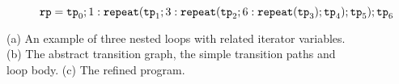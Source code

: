 \begin{figure}
\begin{subfigure}{.9\textwidth}
\begin{centering}
    $\mathtt{rp} = \mathtt{tp}_0; 1: \mathtt{repeat}(\mathtt{tp}_1; 3: {\mathtt{repeat}(\mathtt{tp}_2; 6 : {\mathtt{repeat}(\mathtt{tp}_3)}; \mathtt{tp}_4)}; \mathtt{tp}_5);\mathtt{tp}_6$
    \caption{}
    \end{centering}
    \end{subfigure}
\caption{
        (a) An example of three nested loops with related iterator variables.
        (b) The abstract transition graph, the simple transition paths and loop body.
        (c) The refined program.}
\label{fig:threeWhile-overview}
\end{figure}